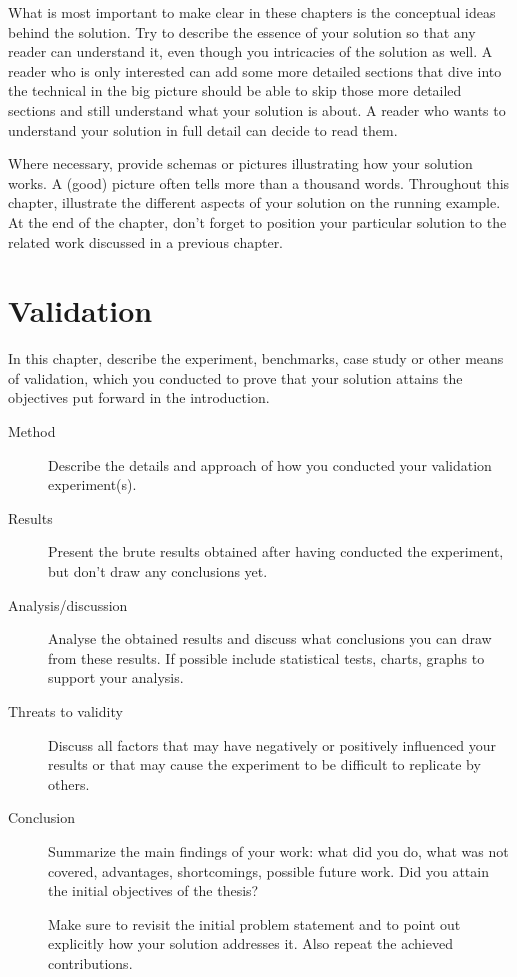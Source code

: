 \documentclass[british]{article}
\begin{document}
What is most important to make clear in these chapters is the
conceptual ideas behind the solution. Try to describe the essence of
your solution so that any reader can understand it, even though you
intricacies of the solution as well. A reader who is only interested
can add some more detailed sections that dive into the technical in
the big picture should be able to skip those more detailed sections
and still understand what your solution is about. A reader who wants
to understand your solution in full detail can decide to read them.

Where necessary, provide schemas or pictures illustrating how your
solution works. A (good) picture often tells more than a thousand
words. Throughout this chapter, illustrate the different aspects of
your solution on the running example. At the end of the chapter, don’t
forget to position your particular solution to the related work
discussed in a previous chapter.

\section*{Validation}

In this chapter, describe the experiment, benchmarks, case study or
other means of validation, which you conducted to prove that your
solution attains the objectives put forward in the introduction.

\begin{description}

\item[Method] Describe the details and approach of how you conducted
  your validation experiment(s).

\item[Results] Present the brute results obtained after having
  conducted the experiment, but don’t draw any conclusions yet.

\item[Analysis/discussion] Analyse the obtained results and discuss
  what conclusions you can draw from these results. If possible
  include statistical tests, charts, graphs to support your analysis.

\item[Threats to validity] Discuss all factors that may have
  negatively or positively influenced your results or that may cause
  the experiment to be difficult to replicate by others.

\item[Conclusion] Summarize the main findings of your work: what did
  you do, what was not covered, advantages, shortcomings, possible
  future work. Did you attain the initial objectives of the thesis?

  Make sure to revisit the initial problem statement and to point out
  explicitly how your solution addresses it. Also repeat the achieved
  contributions.

\end{description}
\end{document}
